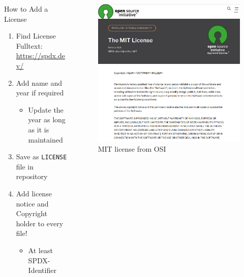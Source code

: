 \documentclass[compress,aspectratio=169]{beamer}
\begin{document}
  \begin{frame}
    \begin{columns}
      \begin{column}{0.5\textwidth}
        \begin{block}{How to Add a License}
          \begin{enumerate}
            \item Find License Fulltext: \url{https://spdx.dev/}
            \item Add name and year if required
              \begin{itemize}
                \item Update the year as long as it is maintained
              \end{itemize}
            \item Save as \texttt{LICENSE} file in repository
            \item Add license notice and Copyright holder to every file!
              \begin{itemize}
                \item At least SPDX-Identifier
              \end{itemize}
          \end{enumerate}
        \end{block}
      \end{column}
      \begin{column}{0.5\textwidth}
        \begin{figure}
          \includegraphics[width=\textwidth]{./assets/mit.png}
          \caption{MIT license from OSI \cite{MITOCI}}
        \end{figure}
      \end{column}
    \end{columns}
  \end{frame}
\end{document}

